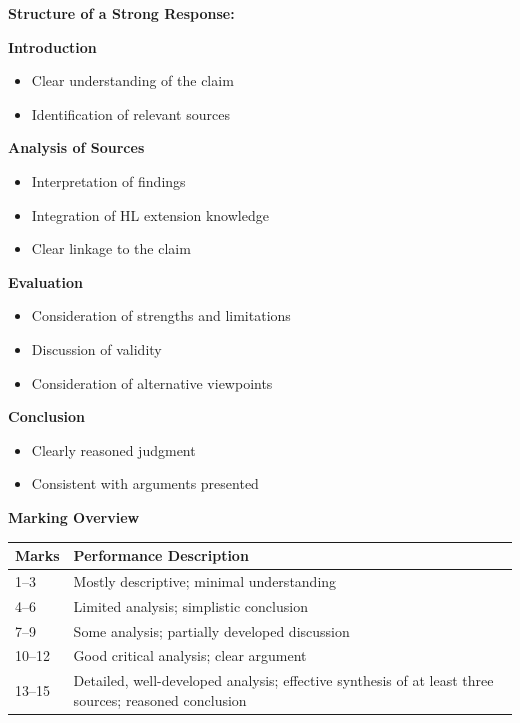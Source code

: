 \documentclass[12pt,a4paper]{article}
\begin{document}
\textbf{Structure of a Strong Response:}

\textbf{Introduction}
\begin{itemize}
    \item Clear understanding of the claim
    \item Identification of relevant sources
\end{itemize}

\textbf{Analysis of Sources}
\begin{itemize}
    \item Interpretation of findings
    \item Integration of HL extension knowledge
    \item Clear linkage to the claim
\end{itemize}

\textbf{Evaluation}
\begin{itemize}
    \item Consideration of strengths and limitations
    \item Discussion of validity
    \item Consideration of alternative viewpoints
\end{itemize}

\textbf{Conclusion}
\begin{itemize}
    \item Clearly reasoned judgment
    \item Consistent with arguments presented
\end{itemize}

\textbf{Marking Overview}

\begin{center}
\begin{tabular}{ll}
\toprule
\textbf{Marks} & \textbf{Performance Description} \\
\midrule
1--3 & Mostly descriptive; minimal understanding \\
4--6 & Limited analysis; simplistic conclusion \\
7--9 & Some analysis; partially developed discussion \\
10--12 & Good critical analysis; clear argument \\
13--15 & Detailed, well-developed analysis; effective synthesis of at least three sources; reasoned conclusion \\
\bottomrule
\end{tabular}
\end{center}

\end{document}
